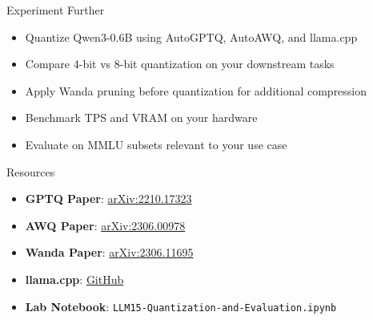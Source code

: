 \documentclass[aspectratio=169,10pt]{beamer}
\begin{document}
\begin{frame}{Experiment Further}
    \begin{itemize}
        \item Quantize Qwen3-0.6B using AutoGPTQ, AutoAWQ, and llama.cpp
        \item Compare 4-bit vs 8-bit quantization on your downstream tasks
        \item Apply Wanda pruning before quantization for additional compression
        \item Benchmark TPS and VRAM on your hardware
        \item Evaluate on MMLU subsets relevant to your use case
    \end{itemize}

    \vspace{0.5cm}
    \begin{block}{Resources}
        \begin{itemize}
            \item \textbf{GPTQ Paper}: \href{https://arxiv.org/abs/2210.17323}{arXiv:2210.17323}
            \item \textbf{AWQ Paper}: \href{https://arxiv.org/abs/2306.00978}{arXiv:2306.00978}
            \item \textbf{Wanda Paper}: \href{https://arxiv.org/abs/2306.11695}{arXiv:2306.11695}
            \item \textbf{llama.cpp}: \href{https://github.com/ggerganov/llama.cpp}{GitHub}
            \item \textbf{Lab Notebook}: \texttt{LLM15-Quantization-and-Evaluation.ipynb}
        \end{itemize}
    \end{block}
\end{frame}
\end{document}
